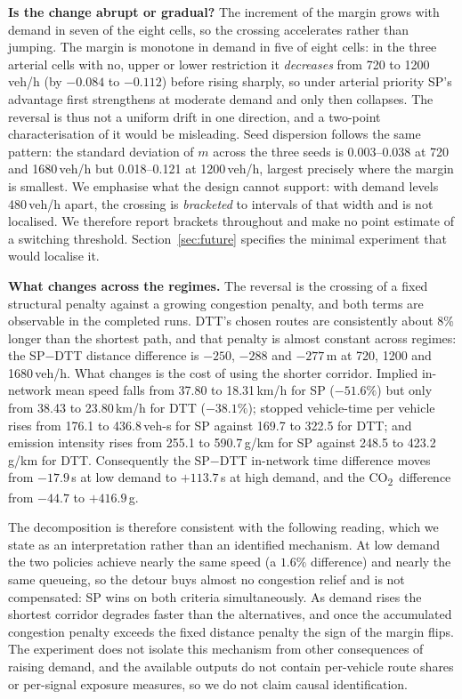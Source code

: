 \documentclass[10pt,a4paper]{article}
\newcommand{\CO}{CO\textsubscript{2}}
\begin{document}
\textbf{Is the change abrupt or gradual?} The increment of the margin grows with demand in seven of the eight cells, so the crossing accelerates rather than jumping. The margin is monotone in demand in five of eight cells: in the three arterial cells with no, upper or lower restriction it \emph{decreases} from 720 to 1200\,veh/h (by $-0.084$ to $-0.112$) before rising sharply, so under arterial priority SP's advantage first strengthens at moderate demand and only then collapses. The reversal is thus not a uniform drift in one direction, and a two-point characterisation of it would be misleading. Seed dispersion follows the same pattern: the standard deviation of $m$ across the three seeds is 0.003--0.038 at 720 and 1680\,veh/h but 0.018--0.121 at 1200\,veh/h, largest precisely where the margin is smallest. We emphasise what the design cannot support: with demand levels 480\,veh/h apart, the crossing is \emph{bracketed} to intervals of that width and is not localised. We therefore report brackets throughout and make no point estimate of a switching threshold. Section~\ref{sec:future} specifies the minimal experiment that would localise it.

\textbf{What changes across the regimes.} The reversal is the crossing of a fixed structural penalty against a growing congestion penalty, and both terms are observable in the completed runs. DTT's chosen routes are consistently about 8\% longer than the shortest path, and that penalty is almost constant across regimes: the SP$-$DTT distance difference is $-250$, $-288$ and $-277$\,m at 720, 1200 and 1680\,veh/h. What changes is the cost of using the shorter corridor. Implied in-network mean speed falls from 37.80 to 18.31\,km/h for SP ($-51.6\%$) but only from 38.43 to 23.80\,km/h for DTT ($-38.1\%$); stopped vehicle-time per vehicle rises from 176.1 to 436.8\,veh-s for SP against 169.7 to 322.5 for DTT; and emission intensity rises from 255.1 to 590.7\,g/km for SP against 248.5 to 423.2\,g/km for DTT. Consequently the SP$-$DTT in-network time difference moves from $-17.9$\,s at low demand to $+113.7$\,s at high demand, and the \CO\ difference from $-44.7$ to $+416.9$\,g.

The decomposition is therefore consistent with the following reading, which we state as an interpretation rather than an identified mechanism. At low demand the two policies achieve nearly the same speed (a $1.6\%$ difference) and nearly the same queueing, so the detour buys almost no congestion relief and is not compensated: SP wins on both criteria simultaneously. As demand rises the shortest corridor degrades faster than the alternatives, and once the accumulated congestion penalty exceeds the fixed distance penalty the sign of the margin flips. The experiment does not isolate this mechanism from other consequences of raising demand, and the available outputs do not contain per-vehicle route shares or per-signal exposure measures, so we do not claim causal identification.
\end{document}
